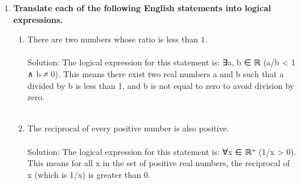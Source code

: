 \documentclass{amsart}
\theoremstyle{definition}
\theoremstyle{Exercise}
\theoremstyle{remark}
\theoremstyle{rule}
\numberwithin{equation}{section}
\begin{document}
\begin{enumerate}[label=(\alph*)]
\item {\bf Translate each of the following English statements into logical expressions.}
\begin{enumerate}[label=(\roman*)]
  \item There are two numbers whose ratio is less than $1$.
   \\\\
Solution: The logical expression for this statement is: ∃a, b ∈ ℝ (a/b < 1 ∧ b ≠ 0). This means there exist two real numbers a and b such that a divided by b is less than 1, and b is not equal to zero to avoid division by zero.
\\\\
  \item The reciprocal of every positive number is also positive.
   \\\\
Solution: The logical expression for this statement is: ∀x ∈ ℝ⁺ (1/x > 0). This means for all x in the set of positive real numbers, the reciprocal of x (which is 1/x) is greater than 0.
\\\\
  \end{enumerate}
  \end{enumerate}
  \newpage
  \section*{}
  \section*{}
\end{document}
